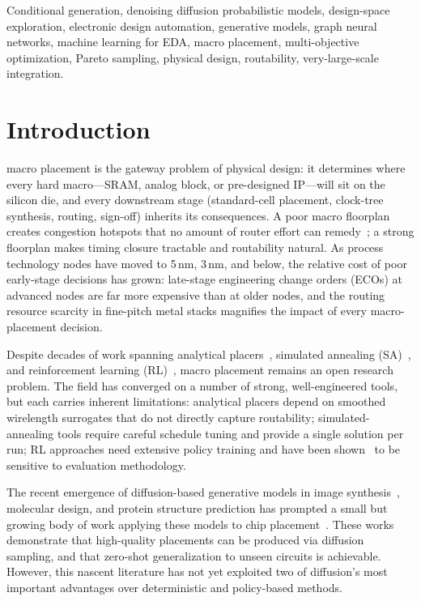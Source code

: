 \documentclass[lettersize,journal]{IEEEtran}
\begin{document}
\begin{IEEEkeywords}
Conditional generation, denoising diffusion probabilistic models, design-space exploration, electronic design automation, generative models, graph neural networks, machine learning for EDA, macro placement, multi-objective optimization, Pareto sampling, physical design, routability, very-large-scale integration.
\end{IEEEkeywords}

\section{Introduction}
 macro placement is the gateway problem of physical design: it determines where every hard macro---SRAM, analog block, or pre-designed IP---will sit on the silicon die, and every downstream stage (standard-cell placement, clock-tree synthesis, routing, sign-off) inherits its consequences. A poor macro floorplan creates congestion hotspots that no amount of router effort can remedy~\cite{kahng2023ml}; a strong floorplan makes timing closure tractable and routability natural. As process technology nodes have moved to 5\,nm, 3\,nm, and below, the relative cost of poor early-stage decisions has grown: late-stage engineering change orders (ECOs) at advanced nodes are far more expensive than at older nodes, and the routing resource scarcity in fine-pitch metal stacks magnifies the impact of every macro-placement decision.

Despite decades of work spanning analytical placers~\cite{lin2019dreamplace, autodmp}, simulated annealing (SA)~\cite{hierrtlmp, tritonmacroplace}, and reinforcement learning (RL)~\cite{mirhoseini2021nature}, macro placement remains an open research problem. The field has converged on a number of strong, well-engineered tools, but each carries inherent limitations: analytical placers depend on smoothed wirelength surrogates that do not directly capture routability; simulated-annealing tools require careful schedule tuning and provide a single solution per run; RL approaches need extensive policy training and have been shown~\cite{cheng2024rethinking} to be sensitive to evaluation methodology.

The recent emergence of diffusion-based generative models in image synthesis~\cite{ho2020ddpm, song2021ddim, dhariwal2021guidance}, molecular design, and protein structure prediction has prompted a small but growing body of work applying these models to chip placement~\cite{lee2024chipdiffusion, fang2025graphdiffusion, trung2025diffplace, yoon2025geometric}. These works demonstrate that high-quality placements can be produced via diffusion sampling, and that zero-shot generalization to unseen circuits is achievable. However, this nascent literature has not yet exploited two of diffusion's most important advantages over deterministic and policy-based methods.
\end{document}
